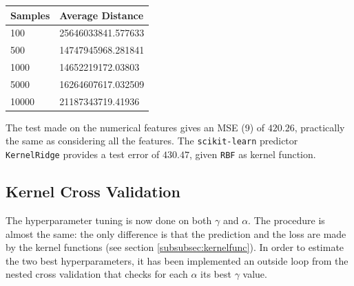 \documentclass{article}
\begin{document}
\begin{table}[H]
	\label{sampletable}
	\centering
	\begin{tabular}{|l|l|}
		\hline
		Samples & Average Distance   \\ \hline
		100     & 25646033841.577633 \\ \hline
		500     & 14747945968.281841 \\ \hline
		1000    & 14652219172.03803  \\ \hline
		5000    & 16264607617.032509 \\ \hline
		10000   & 21187343719.41936  \\ \hline
	\end{tabular}
\end{table}

The test made on the numerical features gives an MSE (9) of $420.26$, practically the same as considering all the features. The \texttt{scikit-learn} predictor \texttt{KernelRidge} provides a test error of $430.47$, given \texttt{RBF} as kernel function. 
    
\subsection{Kernel Cross Validation}
The hyperparameter tuning is now done on both $\gamma$ and $\alpha$. The procedure is almost the same: the only difference is that the prediction and the loss are made by the kernel functions (see section \ref{subsubsec:kernelfunc}). In order to estimate the two best hyperparameters, it has been implemented an outside loop from the nested cross validation that checks for each $\alpha$ its best $\gamma$ value. 
\end{document}
